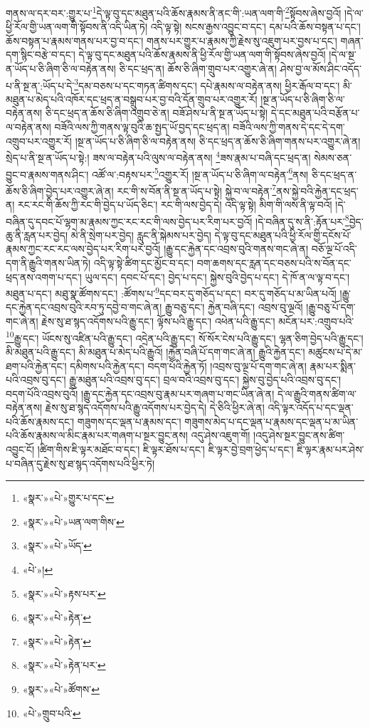 གནས་ལ་དར་བར་:གྱུར་པ་\footnote{«སྣར་»«པེ་»གྱུར་པ་དང་}དེ་ལྟ་བུ་དང་མཐུན་པའི་ཆོས་རྣམས་ནི་ནང་གི་:ཡན་ལག་གི་\footnote{«སྣར་»«པེ་»ཡན་ལག་གིས་}སྟོབས་ཞེས་བྱའོ། །དེ་ལ་ཕྱི་རོལ་གྱི་ཡན་ལག་གི་སྟོབས་ནི་འདི་ཡིན་ཏེ། འདི་ལྟ་སྟེ། སངས་རྒྱས་འབྱུང་བ་དང་། དམ་པའི་ཆོས་བསྟན་པ་དང་། ཆོས་བསྟན་པ་རྣམས་གནས་པར་བྱ་བ་དང་། གནས་པར་གྱུར་པ་རྣམས་ཀྱི་རྗེས་སུ་འཇུག་པར་བྱས་པ་དང་། གཞན་དག་སྙིང་བརྩེ་བ་དང་། དེ་ལྟ་བུ་དང་མཐུན་པའི་ཆོས་རྣམས་ནི་ཕྱི་རོལ་གྱི་ཡན་ལག་གི་སྟོབས་ཞེས་བྱའོ། །དེ་ལ་སྔ་ན་ཡོད་པ་ཅི་ཞིག་ཅི་ལ་བརྟེན་ནས། ཅི་དང་ཕྲད་ན། ཆོས་ཅི་ཞིག་གྲུབ་པར་འགྱུར་ཞེ་ན། ཤེས་བྱ་ལ་མོས་ཤིང་འདོད་པ་ནི་སྔ་ན་:ཡོད་པ་དེ་\footnote{«སྣར་»«པེ་»ཡོད་}དམ་བཅས་པ་དང་གཏན་ཚིགས་དང་། དཔེ་རྣམས་ལ་བརྟེན་ནས། ཕྱིར་རྒོལ་བ་དང་། མི་མཐུན་པ་མེད་པའི་འཁོར་དང་ཕྲད་ན་བསྒྲུབ་པར་བྱ་བའི་དོན་གྲུབ་པར་འགྱུར་རོ། །སྔ་ན་ཡོད་པ་ཅི་ཞིག་ཅི་ལ་བརྟེན་ནས། ཅི་དང་ཕྲད་ན་ཆོས་ཅི་ཞིག་འགྲུབ་ཅེ་ན། བཟོ་ཤེས་པ་ནི་སྔ་ན་ཡོད་པ་སྟེ། དེ་དང་མཐུན་པའི་བརྩོན་པ་ལ་བརྟེན་ནས། བཟོའི་ལས་ཀྱི་གནས་ལྟ་བུའི་ཆ་སྤྱད་ཡོ་བྱད་དང་ཕྲད་ན། བཟོའི་ལས་ཀྱི་གནས་དེ་དང་དེ་དག་འགྲུབ་པར་འགྱུར་རོ། །སྔ་ན་ཡོད་པ་ཅི་ཞིག་ཅི་ལ་བརྟེན་ནས། ཅི་དང་ཕྲད་ན་ཆོས་ཅི་ཞིག་གནས་པར་འགྱུར་ཞེ་ན། སྲེད་པ་ནི་སྔ་ན་ཡོད་པ་སྟེ:། ཟས་ལ་བརྟེན་པའི་ལུས་ལ་བརྟེན་ནས། \footnote{«པེ་»།  }ཟས་རྣམ་པ་བཞི་དང་ཕྲད་ན། སེམས་ཅན་བྱུང་བ་རྣམས་གནས་ཤིང་། འཚོ་ལ་:བརྟས་པར་\footnote{«སྣར་»«པེ་»རྟས་པར་}འགྱུར་རོ། །སྔ་ན་ཡོད་པ་ཅི་ཞིག་ལ་བརྟེན་\footnote{«སྣར་»«པེ་»རྟེན་}ནས། ཅི་དང་ཕྲད་ན་ཆོས་ཅི་ཞིག་བྱེད་པར་འགྱུར་ཞེ་ན། རང་གི་ས་བོན་ནི་སྔ་ན་ཡོད་པ་སྟེ། སྐྱེ་བ་ལ་བརྟེན་\footnote{«སྣར་»«པེ་»རྟེན་}ནས་སྐྱེ་བའི་རྐྱེན་དང་ཕྲད་ན། རང་རང་གི་ཆོས་ཀྱི་རང་གི་བྱེད་པ་ཡོད་ཅིང་། རང་གི་ལས་བྱེད་དེ། འདི་ལྟ་སྟེ། མིག་གི་ལས་ནི་ལྟ་བའོ། །དེ་བཞིན་དུ་དབང་པོ་ལྷག་མ་རྣམས་ཀྱང་རང་རང་གི་ལས་བྱེད་པར་རིག་པར་བྱའོ། །དེ་བཞིན་དུ་ས་ནི་:རྟོན་པར་\footnote{«སྣར་»«པེ་»རྟེན་པར་}བྱེད་ཆུ་ནི་རླན་པར་བྱེད། མེ་ནི་སྲེག་པར་བྱེད། རླུང་ནི་སྐེམས་པར་བྱེད། དེ་ལྟ་བུ་དང་མཐུན་པའི་ཕྱི་རོལ་གྱི་དངོས་པོ་རྣམས་ཀྱང་རང་རང་ལས་བྱེད་པར་རིག་པར་བྱའོ། །རྒྱུ་དང་རྐྱེན་དང་འབྲས་བུའི་གནས་གང་ཞེ་ན། བཅོ་ལྔ་པོ་འདི་དག་ནི་རྒྱུའི་གནས་ཡིན་ཏེ། འདི་ལྟ་སྟེ་ཚིག་དང་མྱོང་བ་དང་། བག་ཆགས་དང་རླན་དང་བཅས་པའི་ས་བོན་དང་ཕྲད་ནས་འགག་པ་དང་། ཡུལ་དང་། དབང་པོ་དང་། བྱེད་པ་དང་། སྐྱེས་བུའི་བྱེད་པ་དང་། དེ་ཁོ་ན་ལ་ལྟ་བ་དང་། མཐུན་པ་དང་། མཐུ་སྣ་ཚོགས་དང་། :ཚོགས་པ་\footnote{«སྣར་»«པེ་»ཚོགས་}དང་བར་དུ་གཅོད་པ་དང་། བར་དུ་གཅོད་པ་མ་ཡིན་པའོ། །རྒྱུ་དང་རྐྱེན་དང་འབྲས་བུའི་རབ་ཏུ་དབྱེ་བ་གང་ཞེ་ན། རྒྱུ་བཅུ་དང་། རྐྱེན་བཞི་དང་། འབྲས་བུ་ལྔའོ། །རྒྱུ་བཅུ་པོ་དག་གང་ཞེ་ན། རྗེས་སུ་ཐ་སྙད་འདོགས་པའི་རྒྱུ་དང་། ལྟོས་པའི་རྒྱུ་དང་། འཕེན་པའི་རྒྱུ་དང་། མངོན་པར་:འགྲུབ་པའི་\footnote{«པེ་»གྲུབ་པའི་}རྒྱུ་དང་། ཡོངས་སུ་འཛིན་པའི་རྒྱུ་དང་། འདྲེན་པའི་རྒྱུ་དང་། སོ་སོར་ངེས་པའི་རྒྱུ་དང་། ལྷན་ཅིག་བྱེད་པའི་རྒྱུ་དང་། མི་མཐུན་པའི་རྒྱུ་དང་། མི་མཐུན་པ་མེད་པའི་རྒྱུའོ། །རྐྱེན་བཞི་པོ་དག་གང་ཞེ་ན། རྒྱུའི་རྐྱེན་དང་། མཚུངས་པ་དེ་མ་ཐག་པའི་རྐྱེན་དང་། དམིགས་པའི་རྐྱེན་དང་། བདག་པོའི་རྐྱེན་ཏོ། །འབྲས་བུ་ལྔ་པོ་དག་གང་ཞེ་ན། རྣམ་པར་སྨིན་པའི་འབྲས་བུ་དང་། རྒྱུ་མཐུན་པའི་འབྲས་བུ་དང་། བྲལ་བའི་འབྲས་བུ་དང་། སྐྱེས་བུ་བྱེད་པའི་འབྲས་བུ་དང་། བདག་པོའི་འབྲས་བུའོ། །རྒྱུ་དང་རྐྱེན་དང་འབྲས་བུ་རྣམ་པར་གཞག་པ་གང་ཡིན་ཞེ་ན། དེ་ལ་རྒྱུའི་གནས་ཚིག་ལ་བརྟེན་ནས། རྗེས་སུ་ཐ་སྙད་འདོགས་པའི་རྒྱུ་འདོགས་པར་བྱེད་དེ། དེ་ཅིའི་ཕྱིར་ཞེ་ན། འདི་ལྟར་འདོད་པ་དང་ལྡན་པའི་ཆོས་རྣམས་དང་། གཟུགས་དང་ལྡན་པ་རྣམས་དང་། གཟུགས་མེད་པ་དང་ལྡན་པ་རྣམས་དང་ལྡན་པ་མ་ཡིན་པའི་ཆོས་རྣམས་ལ་མིང་རྣམ་པར་གཞག་པ་སྔར་བྱུང་ནས། འདུ་ཤེས་འཇུག་གོ། །འདུ་ཤེས་སྔར་བྱུང་ནས་ཚིག་འབྱུང་ངོ། །ཚིག་གིས་ཇི་ལྟར་མཐོང་བ་དང་། ཇི་ལྟར་ཐོས་པ་དང་། ཇི་ལྟར་བྱེ་བྲག་ཕྱེད་པ་དང་། ཇི་ལྟར་རྣམ་པར་ཤེས་པ་བཞིན་དུ་རྗེས་སུ་ཐ་སྙད་འདོགས་པའི་ཕྱིར་ཏེ། 